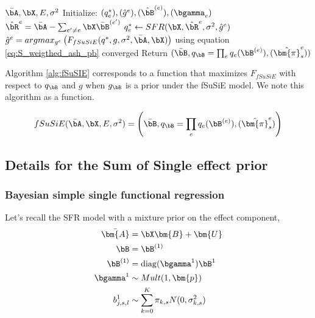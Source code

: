 \begin{algorithm}
\caption{ Coordinate ascent for multivariate regression for  functional data with sum of Single prior (known $\sigma^2$)} \label{alg:fSuSIE}
\begin{algorithmic}[1]
 \STATE $\bar{\bA} , \bX,E,\sigma^2$
 \STATE Initialize: $(q^*_e), (\hat{g}^e) ,(\hat{\bB}^{(e)}), (\bgamma_e )$
\REPEAT 
{}
\STATE $\hat{\bR}^e =\bar{\bA}-\sum_{e'\ne e}\bX\bar{\bB}^{(e')}$ 
\STATE$q_e^* \leftarrow SFR(\bX,\hat{\bR}^e,\sigma^2,\hat{g}^e)$
\STATE $\hat{g}^e  = argmax_{g^e} \left( F_{fSuSiE}(q^*,g, \sigma^2,\bar{\bA},\bX)\right) $ using equation \ref{eq:S_weigthed_ash_pb} 
\ENDFOR
\UNTIL converged
\STATE Return $(\Bar{ \bB }, q_{\bB}=\prod_e q_e(\bB^{(e)}), (\hat{\bm{\pi}}^e_s))$
\end{algorithmic}
\end{algorithm}




Algorithm \ref{alg:fSuSIE} corresponds to a function that maximizes $F_{ fSuSiE}$ with respect to $q_{\bB} $ and $g$ when $g_{\bB} $ is a prior under the fSuSiE model. We note this algorithm as a function. 


 
\begin{align}
    fSuSiE(\Bar{\bA}, \bX, E,\sigma^2) =\left(\Bar{ \bB }, q_{\bB}=\prod_e q_e(\bB^{(e)}), (\hat{\bm{\pi}}^e_s) \right)
\end{align}


\subsection{Details for the Sum of Single effect prior}\label{subsec:detail_fsusie}



\subsubsection{Bayesian simple single functional regression}

Let's recall the SFR model with a mixture prior on the effect component,
 \begin{align}
    \bar{\bm{A}} &= \bX\bm{B}+\bm{U}\\
     \bB & = \bB^{(1)}\\
     \bB^{(1)}&=\operatorname{diag}(\bgamma ^1)\bB ^1 \\
     \bgamma^1 & \sim Mult(1, \bm{p})\\
    b^1_{j,s,l} &\sim  \sum_{k=0}^{K} \pi_{k,s} N(0,\sigma_{k,s}^2)
\end{align}


